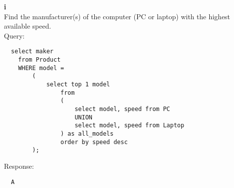 \documentclass[12pt, letterpaper, fleqn]{article}
\begin{document}
  \textbf{i} \\
  Find the manufacturer(s) of the computer (PC or laptop) with the highest
  available speed.\\

  Query:
  \begin{verbatim}
  select maker
    from Product
    WHERE model =
        (
            select top 1 model
                from
                (
                    select model, speed from PC
                    UNION
                    select model, speed from Laptop
                ) as all_models
                order by speed desc
        );
  \end{verbatim}

  Response:
  \begin{verbatim}
  A
  \end{verbatim}
\end{document}
